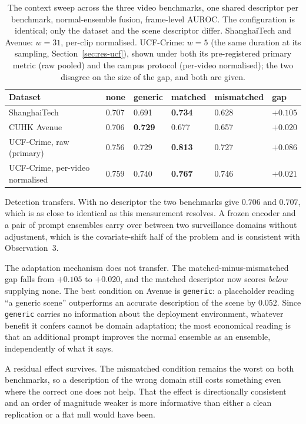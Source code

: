 \documentclass[a4paper,fleqn]{cas-sc}
\begin{document}
\begin{table}[width=\linewidth,cols=6,pos=h]
\caption{The context sweep across the three video benchmarks, one shared
descriptor per benchmark, normal-ensemble fusion, frame-level AUROC. The
configuration is identical; only the dataset and the scene descriptor differ.
ShanghaiTech and Avenue: $w{=}31$, per-clip normalised. UCF-Crime: $w{=}5$ (the
same duration at its sampling, Section~\ref{sec:res-ucf}), shown under both its
pre-registered primary metric (raw pooled) and the campus protocol (per-video
normalised); the two disagree on the size of the gap, and both are given.}
\label{tbl:avenue}
\begin{tabularx}{\linewidth}{@{}Z l l l l l@{}}
\toprule
\textbf{Dataset} & \textbf{none} & \textbf{generic} & \textbf{matched} & \textbf{mismatched} & \textbf{gap} \\
\midrule
ShanghaiTech & 0.707 & 0.691 & \textbf{0.734} & 0.628 & $+0.105$ \\
CUHK Avenue  & 0.706 & \textbf{0.729} & 0.677 & 0.657 & $+0.020$ \\
UCF-Crime, raw (primary)        & 0.756 & 0.729 & \textbf{0.813} & 0.727 & $+0.086$ \\
UCF-Crime, per-video normalised & 0.759 & 0.740 & \textbf{0.767} & 0.746 & $+0.021$ \\
\bottomrule
\end{tabularx}
\end{table}

Detection transfers. With no descriptor the two benchmarks give $0.706$ and
$0.707$, which is as close to identical as this measurement resolves. A frozen
encoder and a pair of prompt ensembles carry over between two surveillance
domains without adjustment, which is the covariate-shift half of the problem and
is consistent with Observation~3.

The adaptation mechanism does not transfer. The matched-minus-mismatched gap
falls from $+0.105$ to $+0.020$, and the matched descriptor now scores
\emph{below} supplying none. The best condition on Avenue is \texttt{generic}: a
placeholder reading ``a generic scene'' outperforms an accurate description of
the scene by $0.052$. Since \texttt{generic} carries no information about the
deployment environment, whatever benefit it confers cannot be domain adaptation;
the most economical reading is that an additional prompt improves the normal
ensemble as an ensemble, independently of what it says.

A residual effect survives. The mismatched condition remains the worst on both
benchmarks, so a description of the wrong domain still costs something even
where the correct one does not help. That the effect is directionally consistent
and an order of magnitude weaker is more informative than either a clean
replication or a flat null would have been.
\end{document}
